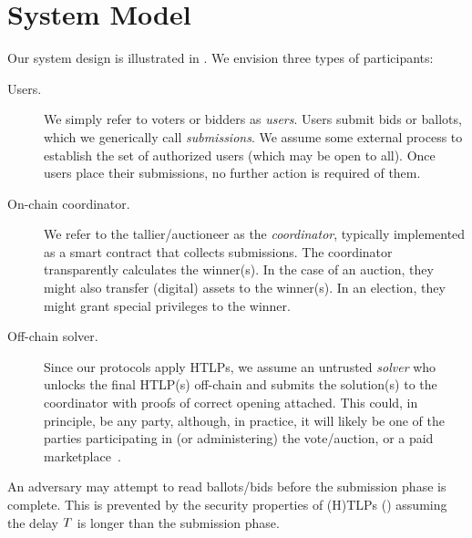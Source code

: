 \section{System Model}\label{sec:model}



Our system design is illustrated in . We envision three types of participants:
\begin{description}
    \item[Users.] We simply refer to voters or bidders as \emph{users}. Users submit bids or ballots, which we generically call \emph{submissions}. We assume some external process to establish the set of authorized users (which may be open to all).  Once users place their submissions, no further action is required of them. 
    \item[On-chain coordinator.] We refer to the tallier/auctioneer as the \emph{coordinator}, typically implemented as a smart contract that collects submissions. The coordinator transparently calculates the winner(s). In the case of an auction, they might also transfer (digital) assets to the winner(s). In an election, they might grant special privileges to the winner.%
    \item[Off-chain solver.] Since our protocols apply HTLPs, we assume an untrusted \emph{solver} who unlocks the final HTLP(s) off-chain and submits the solution(s) to the coordinator with proofs of correct opening attached. This could, in principle, be any party, although, in practice, it will likely be one of the parties participating in (or administering) the vote/auction, or a paid marketplace~\cite{EPRINT:Abadi23,CCS:TGBKS21}.
\end{description}

An adversary may attempt to read ballots/bids before the submission phase is complete. This is prevented by the security properties of (H)TLPs () assuming the delay $T$ is longer than the submission phase.
